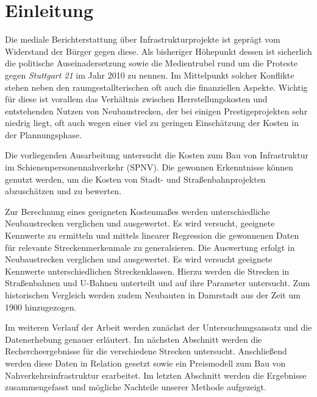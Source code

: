 \chapter{Einleitung}


Die mediale Berichterstattung über Infrastrukturprojekte ist geprägt vom Widerstand der
Bürger gegen diese. Als bisheriger Höhepunkt dessen ist sicherlich die politische
Auseinadersetzung sowie die Medientrubel rund um die Proteste gegen \emph{Stuttgart 21} im
Jahr 2010 zu nennen. Im Mittelpunkt solcher Konflikte stehen neben den raumgestallterischen
oft auch die finanziellen Aspekte. Wichtig für diese ist vorallem das Verhältnis zwischen
Herrstellungskosten und entstehenden Nutzen von Neubaustrecken, der bei einigen
Prestigeprojekten sehr niedrig liegt, oft auch wegen einer viel zu geringen Einschätzung
der Kosten in der Plannungsphase.

Die vorliegenden Ausarbeitung untersucht die Kosten zum Bau von Infrastruktur im
Schienenpersonennahverkehr (SPNV). Die gewonnen Erkenntnisse können genutzt werden, um die
Kosten von Stadt- und Straßenbahnprojekten abzuschätzen und zu bewerten.

Zur Berechnung eines geeigneten Kostenmaßes werden unterschiedliche
Neubaustrecken verglichen und ausgewertet. Es wird versucht, geeignete
Kennwerte zu ermitteln und mittels linearer Regression die gewonnenen Daten
für relevante Streckenmerkenmale zu generalsieren. Die Auswertung erfolgt in
Neubaustrecken verglichen und ausgewertet. Es wird versucht geeignete Kennwerte
unterschiedlichen Streckenklassen. Hierzu werden die Strecken in Straßenbahnen
und U-Bahnen unterteilt und auf ihre Parameter untersucht. Zum historischen
Vergleich werden zudem Neubauten in Damrstadt aus der Zeit um 1900 hinzugezogen.

Im weiteren Verlauf der Arbeit werden zunächst der Untersuchungsansatz und die
Datenerhebung genauer erläutert. Im nächsten Abschnitt werden die Rechercheergebnisse
für die verschiedene Strecken untersucht. Anschließend werden diese Daten in Relation
gesetzt sowie ein Preismodell zum Bau von Nahverkehrsinfrastruktur erarbeitet. Im letzten
Abschnitt werden die Ergebnisse zusammengefasst und mögliche Nachteile unserer Methode
aufgezeigt.
